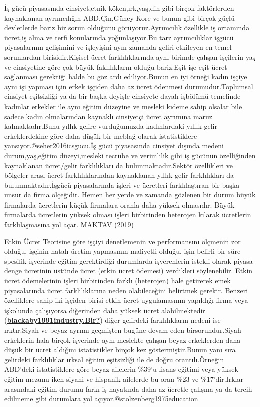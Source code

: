 \documentclass[
  12pt,
]{article}
\begin{document}
İş gücü piyasasında cinsiyet,etnik köken,ırk,yaş,din gibi birçok faktörlerden kaynaklanan ayrımcılığın ABD,Çin,Güney Kore ve bunun gibi birçok güçlü devletlerde bariz bir sorun olduğunu görüyoruz.Ayrımcılık özellikle iş ortamında ücret,iş alma ve terfi konularında yoğunlaşıyor.Bu tarz ayrımcılıklar işgücü piyasalarının gelişimini ve işleyişini aynı zamanda geliri etkileyen en temel sorunlardan birisidir.Kişisel ücret farklılıklarında aynı birimde çalışan işçilerin yaş ve cinsiyetine göre çok büyük faklılıkların olduğu bariz.Eşit işe eşit ücret sağlanması gerektiği halde bu göz ardı ediliyor.Bunun en iyi örneği kadın işçiye aynı işi yapması için erkek işçiden daha az ücret ödenmesi durumudur.Toplumsal cinsiyet eşitsizliği ya da bir başka deyişle cinsiyete dayalı işbölümü temelinde kadınlar erkekler ile aynı eğitim düzeyine ve mesleki kıdeme sahip olsalar bile sadece kadın olmalarından kaynaklı cinsiyetçi ücret ayrımına maruz kalmaktadır.Bunu yıllık gelire vurduğumuzda kadınlardaki yıllık gelir erkeklerdekine göre daha düşük bir meblağ olarak istatistiklere yansıyor.@seher2016icsgucu.İş gücü piyasasında cinsiyet dışında medeni durum,yaş,eğitim düzeyi,mesleki tecrübe ve verimlilik gibi iş gücünün özelliğinden kaynaklanan ücret/gelir farklılıkları da bulunmaktadır.Sektör özellikleri ve bölgeler arası ücret farklılıklarından kaynaklanan yıllık gelir farklılıkları da bulunmaktadır.İşgücü piyasalarında işleri ve ücretleri farklılaştıran bir başka unsur da firma ölçeğidir. Hemen her yerde ve zamanda gözlenen bir durum büyük firmalarda ücretlerin küçük firmalara oranla daha yüksek olmasıdır. Büyük firmalarda ücretlerin yüksek olması işleri birbirinden heterojen kılarak ücretlerin farklılaşmasına yol açar. MAKTAV (\protect\hyperlink{ref-maktav2019icsgucu}{2019})

Etkin Ücret Teorisine göre işçiyi denetlemenin ve performansını ölçmenin zor olduğu, işçinin hatalı üretim yapmasının maliyetli olduğu, işin belirli bir süre spesifik işyerinde eğitim gerektirdiği durumlarda işverenlerin istekli olarak piyasa denge ücretinin üstünde ücret (etkin ücret ödemesi) verdikleri söylenebilir. Etkin ücret ödemelerinin işleri birbirinden farklı (heterojen) hale getirerek emek piyasalarında ücret farklılıklarına neden olabileceğini belirtmek gerekir. Benzeri özelliklere sahip iki işçiden birisi etkin ücret uygulamasının yapıldığı firma veya işkolunda çalışıyorsa diğerinden daha yüksek ücret alabilmektedir (\protect\hyperlink{ref-blackaby1991industry.Bir}{\textbf{blackaby1991industry.Bir?}}) diğer gelirdeki farklılıkların nedeni ise ırktır.Siyah ve beyaz ayrımı geçmişten bugüne devam eden birsorundur.Siyah erkeklerin hala birçok işyerinde aynı meslekte çalışan beyaz erkeklerden daha düşük bir ücret aldığını istatistikler birçok kez göstermiştir.Bunun yanı sıra gelirdeki farklılıklar ırksal eğitim eşitsizliği ile de doğru orantılı.Örneğin ABD'deki istatistiklere göre beyaz ailelerin \%39'u lisans eğitimi veya yüksek eğitim mezunu iken siyahi ve hispanik ailelerde bu oran \%23 ve \%17'dir.Irklar arasındaki eğitim durumu farkı iş hayatında daha az ücretle çalışma ya da tercih edilmeme gibi durumlara yol açıyor.@stolzenberg1975education
\end{document}
